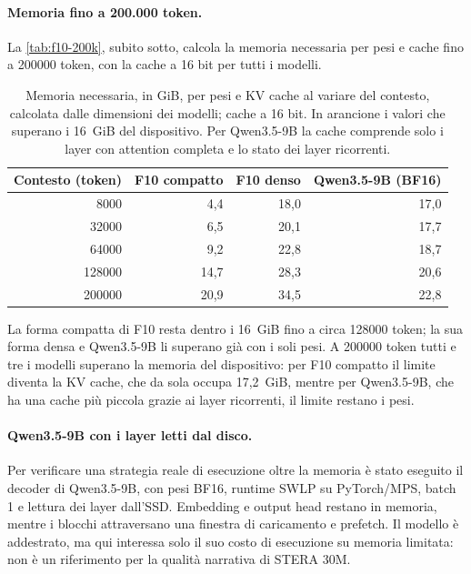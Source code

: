 \paragraph{Memoria fino a 200.000 token.} La \autoref{tab:f10-200k}, subito sotto, calcola la memoria necessaria per pesi e cache fino a \num{200000} token, con la cache a 16 bit per tutti i modelli.

\begin{table}[H]
\centering
\small
\begin{tabular}{rrrr}
\toprule
Contesto (token) & F10 compatto & F10 denso & Qwen3.5-9B (BF16) \\
\midrule
\num{8000} & 4,4 & \cellcolor{steraArancio!25}18,0 & \cellcolor{steraArancio!25}17,0 \\
\num{32000} & 6,5 & \cellcolor{steraArancio!25}20,1 & \cellcolor{steraArancio!25}17,7 \\
\num{64000} & 9,2 & \cellcolor{steraArancio!25}22,8 & \cellcolor{steraArancio!25}18,7 \\
\num{128000} & 14,7 & \cellcolor{steraArancio!25}28,3 & \cellcolor{steraArancio!25}20,6 \\
\num{200000} & \cellcolor{steraArancio!25}20,9 & \cellcolor{steraArancio!25}34,5 & \cellcolor{steraArancio!25}22,8 \\
\bottomrule
\end{tabular}
\caption{Memoria necessaria, in GiB, per pesi e KV cache al variare del contesto, calcolata dalle dimensioni dei modelli; cache a 16 bit. In arancione i valori che superano i 16~GiB del dispositivo. Per Qwen3.5-9B la cache comprende solo i layer con attention completa e lo stato dei layer ricorrenti.}
\label{tab:f10-200k}
\end{table}

La forma compatta di F10 resta dentro i 16~GiB fino a circa \num{128000} token; la sua forma densa e Qwen3.5-9B li superano già con i soli pesi. A \num{200000} token tutti e tre i modelli superano la memoria del dispositivo: per F10 compatto il limite diventa la KV cache, che da sola occupa 17,2~GiB, mentre per Qwen3.5-9B, che ha una cache più piccola grazie ai layer ricorrenti, il limite restano i pesi.

\paragraph{Qwen3.5-9B con i layer letti dal disco.} Per verificare una strategia reale di esecuzione oltre la memoria è stato eseguito il decoder di Qwen3.5-9B, con pesi BF16, runtime SWLP su PyTorch/MPS, batch 1 e lettura dei layer dall'SSD. Embedding e output head restano in memoria, mentre i blocchi attraversano una finestra di caricamento e prefetch. Il modello è addestrato, ma qui interessa solo il suo costo di esecuzione su memoria limitata: non è un riferimento per la qualità narrativa di STERA 30M.


